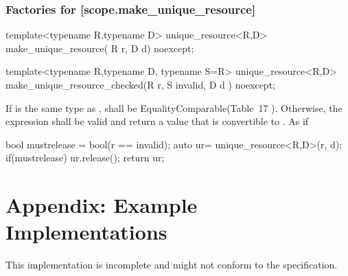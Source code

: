 \documentclass[ebook,11pt,article]{memoir}
\begin{document}
\subsection {Factories for  [scope.make_unique_resource]}
\begin{itemdecl}
template<typename R,typename D>
unique_resource<R,D>
make_unique_resource( R r, D d) noexcept;
\end{itemdecl}

\pnum
\returns {}

\begin{itemdecl}
template<typename R,typename D, typename S=R>
unique_resource<R,D>
make_unique_resource_checked(R r, S invalid, D d ) noexcept;
\end{itemdecl}

\pnum
\requires If  is the same type as ,  shall be EqualityComparable(Table~17
). Otherwise, the expression  shall be valid and return a value that is convertible to . 
\pnum
\effects As if
\begin{codeblock}
  bool mustrelease = bool(r == invalid);
  auto ur= unique_resource<R,D>(r, d);
  if(mustrelease) ur.release();
  return ur;
\end{codeblock}

\newpage
\chapter{Appendix: Example Implementations}
This implementation is incomplete and might not conform to the specification.
\end{document}
